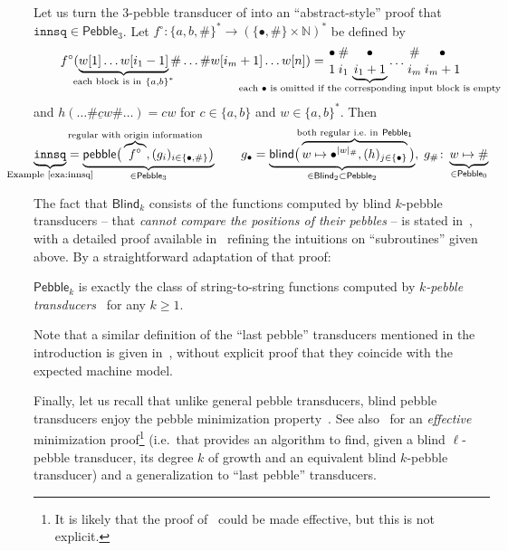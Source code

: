 \documentclass{fundam}
\newcommand{\bbN}{\mathbb{N}}
\newcommand{\pebble}{\mathsf{pebble}}
\newcommand{\blind}{\mathsf{blind}}
\newcommand{\Pebble}{\mathsf{Pebble}}
\newcommand{\Blind}{\mathsf{Blind}}
\newcommand{\worig}{\genfrac{}{}{0pt}{}}
\theoremstyle{claimstyle}
\newcommand\innsq{\mathtt{innsq}}
\begin{document}
\begin{example}\label{exa:innsq-pebble}
  Let us turn the 3-pebble transducer of
   into an \enquote{abstract-style} proof that
  $\innsq\in\Pebble_3$.
  Let $f^\circ \colon \{a,b,\#\}^* \to (\{\bullet,\#\}\times\bbN)^*$ be defined by
  \[ f^\circ(\underbrace{w[1] \dots w[i_1-1]}_{\mathclap{\text{each block is in}\ \{a,b\}^*}} \# \dots \# w[i_m+1] \dots w[n]) = \worig{\bullet}{1}\worig{\#}{i_1}\underbrace{\worig{\bullet}{i_1+1}}_{\mathclap{\text{each $\bullet$ is omitted if the corresponding input block is empty}}}\dots\worig{\#}{i_m}\worig{\bullet}{i_m+1} \]
  and $h(\dots\#\underline{c}w\#\dots) = cw$ for $c\in\{a,b\}$ and $w\in\{a,b\}^*$. Then
  \[ \underbrace{\innsq}_{\mathclap{\text{Example~\ref{exa:innsq}}}} = \underbrace{\pebble\big(\overbrace{f^\circ}^{\mathclap{\text{regular with origin information}}}, (g_i)_{i\in\{\bullet,\#\}}\big)}_{\in\Pebble_3} \qquad g_\bullet = \underbrace{\blind\big(\overbrace{w \mapsto \bullet^{|w|_\#}, (h)_{j\in\{\bullet\}}}^{\mathclap{\text{both regular i.e.\ in}\ \Pebble_1}}\big)}_{\in\Blind_2\subset\Pebble_2}, \; g_\# \colon \underbrace{w \mapsto \#}_{\mathclap{\in\Pebble_0}} \]
\end{example}
The fact that $\Blind_k$ consists of the functions computed by blind $k$-pebble
transducers -- that \emph{cannot compare the positions of their pebbles} -- is stated
in~\cite[\S5]{NguyenNP21}, with a detailed proof available
in~\cite[Appendix~D]{NguyenNP21} refining the intuitions on
\enquote{subroutines} given above. By a straightforward adaptation of that
proof:
\begin{proposition}
  $\Pebble_k$ is exactly the class of string-to-string functions computed by \emph{$k$-pebble transducers}~\cite[\S2]{PolyregSurvey} for any $k\geq1$.
\end{proposition}
Note that a similar definition of the \enquote{last pebble} transducers
mentioned in the introduction is given in~\cite[Definition~3.3]{LastPebble},
without explicit proof that they coincide with the expected machine model.

Finally, let us recall that unlike general pebble transducers,
blind pebble transducers enjoy the pebble minimization
property~\cite[Theorem~7.1]{NguyenNP21}. See also~\cite{LastPebble} for an
\emph{effective} minimization proof\footnote{It is likely that the proof
  of~\cite{NguyenNP21} could be made effective, but this is not explicit.}
(i.e.\ that provides an algorithm to find, given a blind $\ell$-pebble
transducer, its degree $k$ of growth and an equivalent blind $k$-pebble
transducer) and a generalization to \enquote{last pebble} transducers.
\end{document}
